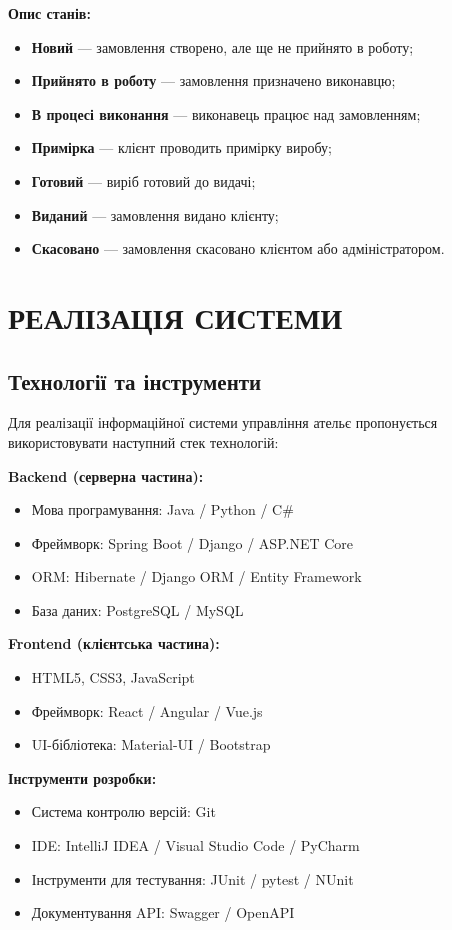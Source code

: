 \documentclass[14pt,a4paper]{extarticle}
\begin{document}
\textbf{Опис станів:}
\begin{itemize}
    \item \textbf{Новий} --- замовлення створено, але ще не прийнято в роботу;
    \item \textbf{Прийнято в роботу} --- замовлення призначено виконавцю;
    \item \textbf{В процесі виконання} --- виконавець працює над замовленням;
    \item \textbf{Примірка} --- клієнт проводить примірку виробу;
    \item \textbf{Готовий} --- виріб готовий до видачі;
    \item \textbf{Виданий} --- замовлення видано клієнту;
    \item \textbf{Скасовано} --- замовлення скасовано клієнтом або адміністратором.
\end{itemize}

\newpage
\section{РЕАЛІЗАЦІЯ СИСТЕМИ}

\subsection{Технології та інструменти}

Для реалізації інформаційної системи управління ательє пропонується використовувати наступний стек технологій:

\textbf{Backend (серверна частина):}
\begin{itemize}
    \item Мова програмування: Java / Python / C\#
    \item Фреймворк: Spring Boot / Django / ASP.NET Core
    \item ORM: Hibernate / Django ORM / Entity Framework
    \item База даних: PostgreSQL / MySQL
\end{itemize}

\textbf{Frontend (клієнтська частина):}
\begin{itemize}
    \item HTML5, CSS3, JavaScript
    \item Фреймворк: React / Angular / Vue.js
    \item UI-бібліотека: Material-UI / Bootstrap
\end{itemize}

\textbf{Інструменти розробки:}
\begin{itemize}
    \item Система контролю версій: Git
    \item IDE: IntelliJ IDEA / Visual Studio Code / PyCharm
    \item Інструменти для тестування: JUnit / pytest / NUnit
    \item Документування API: Swagger / OpenAPI
\end{itemize}
\end{document}
